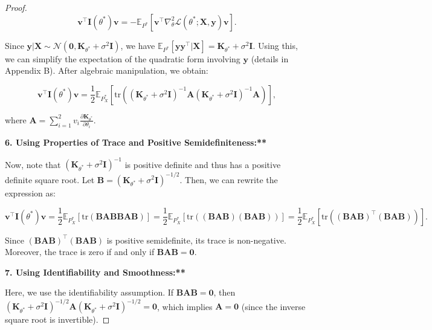 \begin{proof}
$$
\mathbf{v}^\top \mathbf{I}(\theta^*) \mathbf{v} = -\mathbb{E}_{P^*}[\mathbf{v}^\top \nabla^2_\theta \mathcal{L}(\theta^*; \mathbf{X}, \mathbf{y}) \mathbf{v}].
$$

Since $\mathbf{y}|\mathbf{X} \sim \mathcal{N}(\mathbf{0}, \mathbf{K}_{\theta^*} + \sigma^2 \mathbf{I})$, we have $\mathbb{E}_{P^*}[\mathbf{y}\mathbf{y}^\top | \mathbf{X}] = \mathbf{K}_{\theta^*} + \sigma^2 \mathbf{I}$. Using this, we can simplify the expectation of the quadratic form involving $\mathbf{y}$ (details in Appendix B). After algebraic manipulation, we obtain:

$$
\mathbf{v}^\top \mathbf{I}(\theta^*) \mathbf{v} = \frac{1}{2} \mathbb{E}_{P^*_X}\left[ \text{tr}\left( (\mathbf{K}_{\theta^*} + \sigma^2 \mathbf{I})^{-1} \mathbf{A} (\mathbf{K}_{\theta^*} + \sigma^2 \mathbf{I})^{-1} \mathbf{A} \right) \right],
$$

where $\mathbf{A} = \sum_{i=1}^2 v_i \frac{\partial \mathbf{K}_{\theta^*}}{\partial \theta_i}$.

\textbf{6. Using Properties of Trace and Positive Semidefiniteness:**}

Now, note that $(\mathbf{K}_{\theta^*} + \sigma^2 \mathbf{I})^{-1}$ is positive definite and thus has a positive definite square root. Let $\mathbf{B} = (\mathbf{K}_{\theta^*} + \sigma^2 \mathbf{I})^{-1/2}$. Then, we can rewrite the expression as:

$$
\mathbf{v}^\top \mathbf{I}(\theta^*) \mathbf{v} = \frac{1}{2} \mathbb{E}_{P^*_X}\left[ \text{tr}\left( \mathbf{B} \mathbf{A} \mathbf{B} \mathbf{B} \mathbf{A} \mathbf{B} \right) \right] = \frac{1}{2} \mathbb{E}_{P^*_X}\left[ \text{tr}\left( (\mathbf{B} \mathbf{A} \mathbf{B}) (\mathbf{B} \mathbf{A} \mathbf{B}) \right) \right] = \frac{1}{2} \mathbb{E}_{P^*_X}\left[ \text{tr}\left( (\mathbf{B} \mathbf{A} \mathbf{B})^\top (\mathbf{B} \mathbf{A} \mathbf{B}) \right) \right].
$$

Since $(\mathbf{B}\mathbf{A}\mathbf{B})^\top (\mathbf{B}\mathbf{A}\mathbf{B})$ is positive semidefinite, its trace is non-negative. Moreover, the trace is zero if and only if $\mathbf{B}\mathbf{A}\mathbf{B} = \mathbf{0}$.

\textbf{7. Using Identifiability and Smoothness:**}

Here, we use the identifiability assumption. If $\mathbf{B}\mathbf{A}\mathbf{B} = \mathbf{0}$, then $(\mathbf{K}_{\theta^*} + \sigma^2 \mathbf{I})^{-1/2} \mathbf{A} (\mathbf{K}_{\theta^*} + \sigma^2 \mathbf{I})^{-1/2} = \mathbf{0}$, which implies $\mathbf{A} = \mathbf{0}$ (since the inverse square root is invertible).


\end{proof}
